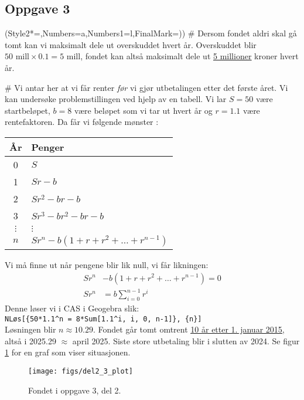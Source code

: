 \documentclass[12pt, a4paper]
{article}						%
\def\answer#1{\underline{\underline{#1}}}
\begin{document}
\subsection*{Oppgave 3}
\begin{easylist}[enumerate]
	\ListProperties(Style2*=,Numbers=a,Numbers1=l,FinalMark={)})
	# Dersom fondet aldri skal gå tomt kan vi maksimalt dele ut overskuddet hvert år.
	Overskuddet blir $50 \text{ mill} \times 0.1 = 5 \text{ mill}$, fondet kan altså maksimalt dele ut \answer{5 millioner} kroner hvert år.
	
	# Vi antar her at vi får renter \emph{før} vi gjør utbetalingen etter det første året. 
	Vi kan undersøke problemstillingen ved hjelp av en tabell.
	Vi lar $S = 50$ være startbeløpet, $b = 8$ være beløpet som vi tar ut hvert år og $r = 1.1$ være rentefaktoren.
	Da får vi følgende mønster :
	\begin{center}
		\begin{tabular}{cl}
			\textbf{År} & \textbf{Penger} \\ \hline
			0 & $S$ \\
			1 & $Sr - b$ \\
			2 & $Sr^2 - br - b$ \\
			3 & $Sr^3 - br^2 - br - b$ \\
			$\vdots$ & $\vdots$ \\
			$n$ & $Sr^n - b \left( 1 + r + r^2 + \dots + r^{n-1}\right)$
		\end{tabular}
	\end{center}
	Vi må finne ut når pengene blir lik null, vi får likningen:
	\begin{align*}
		Sr^n &- b \left( 1 + r + r^2 + \dots + r^{n-1}\right) = 0 \\
		Sr^n &= b \sum_{i=0}^{n-1} r^i
	\end{align*}
	Denne løser vi i CAS i Geogebra slik: \\
	\texttt{NLøs[\{50*1.1\textasciicircum n = 8*Sum[1.1\textasciicircum i, i, 0, n-1]\}, \{n\}]} \\
	Løsningen blir $n \approx 10.29$. Fondet går tomt omtrent \answer{10 år etter 1. januar 2015},
	altså i 2025.29 $\approx$ april 2025. Siste store utbetaling blir i slutten av 2024.
	Se figur \ref{fig:del23plot} for en graf som viser situasjonen.
	
	
\begin{figure}[th!]
	\centering
	\texttt{[image: figs/del2\_3\_plot]}
	\caption{Fondet i oppgave 3, del 2.}
	\label{fig:del23plot}
\end{figure}
\end{easylist}
\end{document}
